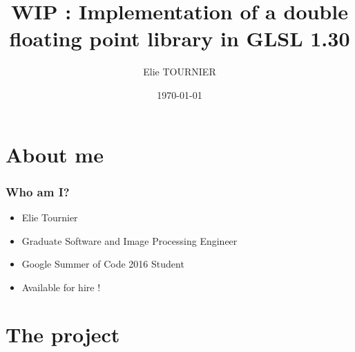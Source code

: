 \documentclass{beamer}
\title[Short title]{WIP : Implementation of a double floating point library in GLSL 1.30}
\author{Elie TOURNIER}
\institute[GSoC]
{
Google Summer of Code 2016

\medskip
\textit{tournier.elie@gmail.com}
}
\date{\today}
\begin{document}
\begin{frame}
\titlepage %
\end{frame}



\section{About me} %

\begin{frame}
\frametitle{Who am I?}
\begin{itemize}
\item Elie Tournier
\item Graduate Software and Image Processing Engineer
\item Google Summer of Code 2016 Student
\item Available for hire !
\end{itemize}
\end{frame}

\section{The project}
\end{document}
